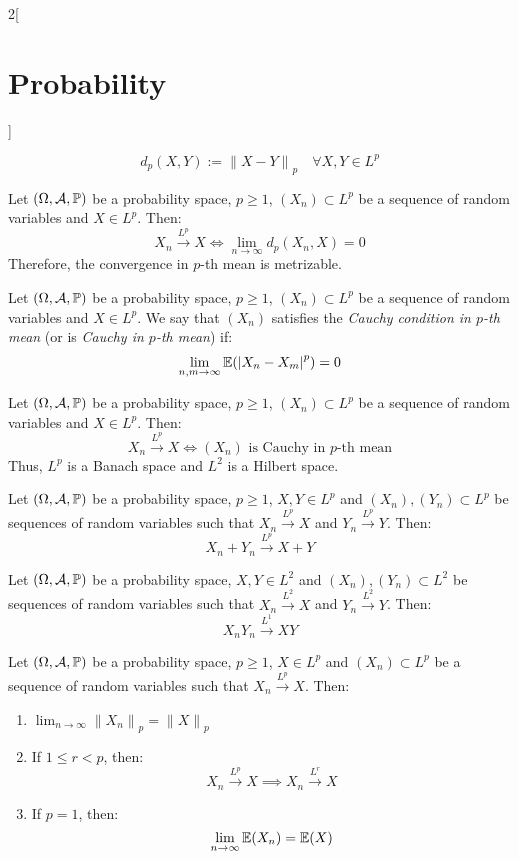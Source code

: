 \documentclass[../../../main.tex]{subfiles}
\begin{document}
\begin{multicols}{2}[\section{Probability}]
\begin{proposition}
    $$d_p(X,Y):={\|X-Y\|}_p\quad\forall X,Y\in L^p$$
  \end{proposition}
  \begin{proposition}
    Let $(\Omega,\mathcal{A},\mathbb{P})$ be a probability space, $p\geq 1$, $(X_n)\subset L^p$ be a sequence of random variables and $X\in L^p$. Then:
    $$X_n\overset{L^p}{\longrightarrow} X\iff\lim_{n\to\infty}d_p(X_n,X)=0$$
    Therefore, the convergence in $p$-th mean is metrizable.
  \end{proposition}
  \begin{definition}
    Let $(\Omega,\mathcal{A},\mathbb{P})$ be a probability space, $p\geq 1$, $(X_n)\subset L^p$ be a sequence of random variables and $X\in L^p$. We say that $(X_n)$ satisfies the \emph{Cauchy condition in $p$-th mean} (or is \emph{Cauchy in $p$-th mean}) if: $$\lim_{n,m\to\infty}\mathbb{E}({|X_n-X_m|}^p)=0$$
  \end{definition}
  \begin{proposition}
    Let $(\Omega,\mathcal{A},\mathbb{P})$ be a probability space, $p\geq 1$, $(X_n)\subset L^p$ be a sequence of random variables and $X\in L^p$. Then:
    $$X_n\overset{L^p}{\longrightarrow} X\iff(X_n)\text{ is Cauchy in $p$-th mean}$$
    Thus, $L^p$ is a Banach space and $L^2$ is a Hilbert space.
  \end{proposition}
  \begin{proposition}
    Let $(\Omega,\mathcal{A},\mathbb{P})$ be a probability space, $p\geq 1$, $X,Y\in L^p$ and $(X_n),(Y_n)\subset L^p$ be sequences of random variables such that $X_n\overset{L^p}{\longrightarrow} X$ and $Y_n\overset{L^p}{\longrightarrow} Y$. Then: $$X_n+Y_n\overset{L^p}{\longrightarrow} X+Y$$
  \end{proposition}
  \begin{proposition}
    Let $(\Omega,\mathcal{A},\mathbb{P})$ be a probability space, $X,Y\in L^2$ and $(X_n),(Y_n)\subset L^2$ be sequences of random variables such that $X_n\overset{L^2}{\longrightarrow} X$ and $Y_n\overset{L^2}{\longrightarrow} Y$. Then: $$X_nY_n\overset{L^1}{\longrightarrow} XY$$
  \end{proposition}
  \begin{proposition}
    Let $(\Omega,\mathcal{A},\mathbb{P})$ be a probability space, $p\geq 1$, $X\in L^p$ and $(X_n)\subset L^p$ be a sequence of random variables such that $X_n\overset{L^p}{\longrightarrow} X$. Then:
    \begin{enumerate}
      \item $\displaystyle\lim_{n\to\infty}{\|X_n\|}_p={\|X\|}_p$
      \item If $1\leq r< p$, then: $$X_n\overset{L^p}{\longrightarrow} X\implies X_n\overset{L^r}{\longrightarrow} X$$
      \item If $p=1$, then: $$\lim_{n\to\infty}\mathbb{E}(X_n)=\mathbb{E}(X)$$
    \end{enumerate}
  \end{proposition}

\end{multicols}
\end{document}
